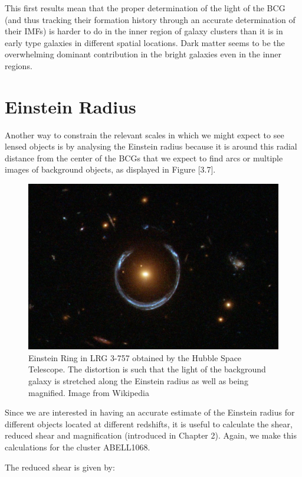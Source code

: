 This first results mean that the proper determination of the light of the BCG (and thus tracking their formation history through an accurate determination of their IMFs) is harder to do in the inner region of galaxy clusters than it is in early type galaxies in different spatial locations. Dark matter seems to be the overwhelming dominant contribution in the bright galaxies even in the inner regions.

\section{Einstein Radius}

Another way to constrain the relevant scales in which we might expect to see lensed objects is by analysing the Einstein radius because it is around this radial distance from the center of the BCGs that we expect to find arcs or multiple images of background objects, as displayed in Figure [3.7]. 

\begin{figure}[H]
\centering
\includegraphics[width=12cm]{images/einstein_ring_wiki.jpg}
\caption[Einstein Ring in LRG 3-757]{Einstein Ring in LRG 3-757 obtained by the Hubble Space Telescope. The distortion is such that the light of the background galaxy is stretched along the Einstein radius as well as being magnified. Image from Wikipedia}
\end{figure}

Since we are interested in having an accurate estimate of the Einstein radius for different objects located at different redshifts, it is useful to calculate the shear, reduced shear and magnification (introduced in Chapter 2). Again, we make this calculations for the cluster ABELL1068.

The reduced shear is given by:

